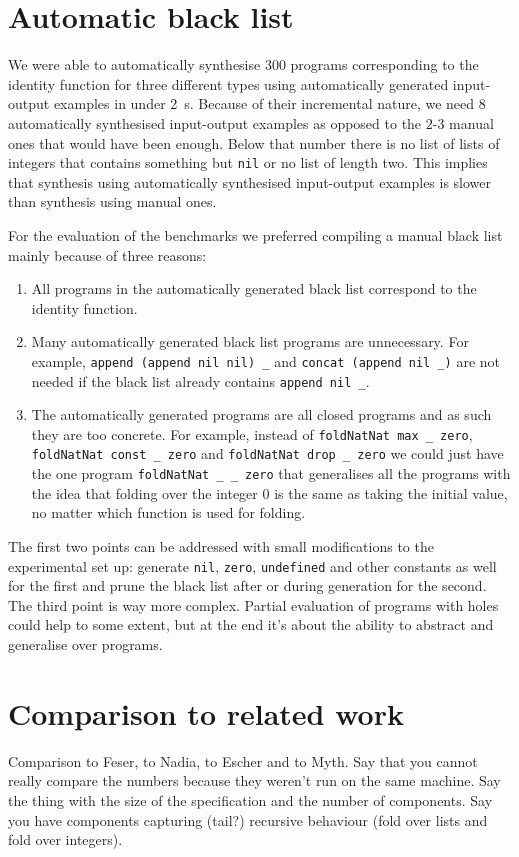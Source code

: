 \section{Automatic black list}\label{Automatic black list}
We were able to automatically synthesise $300$ programs corresponding to the identity function for three different types using automatically generated input-output examples in under \SI{2}{s}. Because of their incremental nature, we need $8$ automatically synthesised input-output examples as opposed to the $2$-$3$ manual ones that would have been enough. Below that number there is no list of lists of integers that contains something but \lstinline?nil? or no list of length two. This implies that synthesis using automatically synthesised input-output examples is slower than synthesis using manual ones.

For the evaluation of the benchmarks we preferred compiling a manual black list mainly because of three reasons: 
\begin{enumerate}
\item All programs in the automatically generated black list correspond to the identity function.
\item Many automatically generated black list programs are unnecessary. For example, \lstinline?append (append nil nil) _? and \lstinline?concat (append nil _)? are not needed if the black list already contains \lstinline?append nil _?.
\item The automatically generated programs are all closed programs and as such they are too concrete. For example, instead of \lstinline?foldNatNat max _ zero?, \lstinline?foldNatNat const _ zero? and \lstinline?foldNatNat drop _ zero? we could just have the one program \lstinline?foldNatNat _ _ zero? that generalises all the programs with the idea that folding over the integer $0$ is the same as taking the initial value, no matter which function is used for folding.
\end{enumerate}

The first two points can be addressed with small modifications to the experimental set up: generate \lstinline?nil?, \lstinline?zero?, \lstinline?undefined? and other constants as well for the first and prune the black list after or during generation for the second.
The third point is way more complex. Partial evaluation of programs with holes could help to some extent, but at the end it's about the ability to abstract and generalise over programs.

\section{Comparison to related work}
Comparison to Feser, to Nadia, to Escher and to Myth. Say that you cannot really compare the numbers because they weren't run on the same machine. Say the thing with the size of the specification and the number of components. Say you have components capturing (tail?) recursive behaviour (fold over lists and fold over integers).


